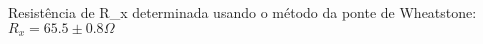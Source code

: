 
Resistência de R_x determinada usando o método da ponte de Wheatstone:
$R_x = 65.5 \pm 0.8 \Omega$
